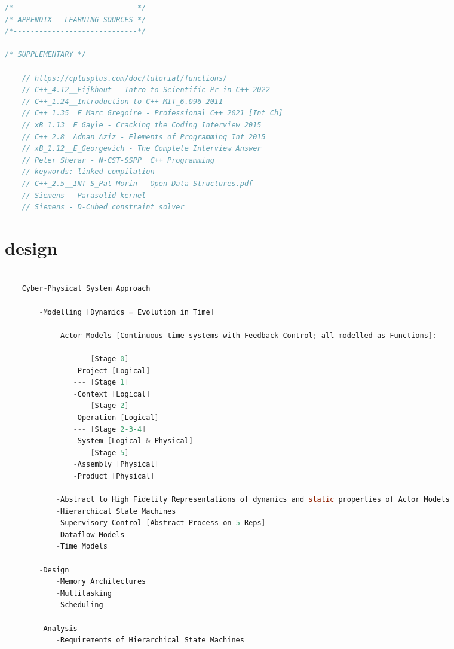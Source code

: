 \documentclass[8pt]{extarticle}
\begin{document}
\begin{small}
\begin{multicols}{2}
\begin{lstlisting}[language=C]
/*-----------------------------*/
/* APPENDIX - LEARNING SOURCES */
/*-----------------------------*/

/* SUPPLEMENTARY */

	// https://cplusplus.com/doc/tutorial/functions/
	// C++_4.12__Eijkhout - Intro to Scientific Pr in C++ 2022
	// C++_1.24__Introduction to C++ MIT_6.096 2011
	// C++_1.35__E_Marc Gregoire - Professional C++ 2021 [Int Ch]
	// xB_1.13__E_Gayle - Cracking the Coding Interview 2015
	// C++_2.8__Adnan Aziz - Elements of Programming Int 2015
	// xB_1.12__E_Georgevich - The Complete Interview Answer
	// Peter Sherar - N-CST-SSPP_ C++ Programming
	// keywords: linked compilation
	// C++_2.5__INT-S_Pat Morin - Open Data Structures.pdf
	// Siemens - Parasolid kernel
	// Siemens - D-Cubed constraint solver
\end{lstlisting}

\section{design}

\begin{lstlisting}[language=C]

	Cyber-Physical System Approach
	
		-Modelling [Dynamics = Evolution in Time]

		   	-Actor Models [Continuous-time systems with Feedback Control; all modelled as Functions]:
		   		
		   		--- [Stage 0]
		   		-Project [Logical]
		   		--- [Stage 1]
		   		-Context [Logical]
		   		--- [Stage 2]
				-Operation [Logical]
				--- [Stage 2-3-4]
				-System [Logical & Physical]
				--- [Stage 5]
		   		-Assembly [Physical]
		   		-Product [Physical]
		   		
		   	-Abstract to High Fidelity Representations of dynamics and static properties of Actor Models
		   	-Hierarchical State Machines
		   	-Supervisory Control [Abstract Process on 5 Reps]
		   	-Dataflow Models
		   	-Time Models

		-Design
			-Memory Architectures
			-Multitasking
			-Scheduling
			
		-Analysis
		   	-Requirements of Hierarchical State Machines

\end{lstlisting}

\vfill\null
\columnbreak
\vfill\null

\end{multicols}
\end{small}
\end{document}
